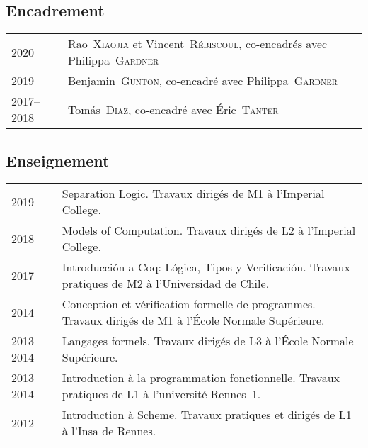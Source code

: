 \documentclass[12pt,a4paper]{article}
\makeatletter
\newcommand{\en}[1]{\foreignlanguage{english}{{#1}}}
\newcommand{\es}[1]{\foreignlanguage{spanish}{{#1}}}
\newcommand{\en}[1]{\foreignlanguage{english}{{#1}}}
\newcommand{\es}[1]{\foreignlanguage{spanish}{{#1}}}
\newenvironment{datecvsection}[1]%
               {\subsection*{#1}%
                 \noindent \begin{tabular}{@{}p{\annee}p{\texte}@{}}}
               {\end{tabular}}
\newcommand\familyName{\textsc}
\newcommand\placeName{}
\makeatother
\begin{document}
\begin{datecvsection}{Encadrement}

    2020 & Rao~\familyName{Xiaojia} et Vincent~\familyName{Rébiscoul}, co-encadrés avec Philippa~\familyName{Gardner} \\
    2019 & Benjamin~\familyName{Gunton}, co-encadré avec Philippa~\familyName{Gardner} \\
    2017–2018 & Tomás~\familyName{Diaz}, co-encadré avec Éric~\familyName{Tanter} \\

\end{datecvsection}

\begin{datecvsection}{Enseignement}

    2019 & Separation Logic. Travaux dirigés de M1 à l’\en{\placeName{Imperial College}}. \\

    2018 & Models of Computation. Travaux dirigés de L2 à l’\en{\placeName{Imperial College}}. \\

    2017 & Introducción a Coq: Lógica, Tipos y Verificación. Travaux pratiques de M2 à l’\es{\placeName{Universidad de Chile}}. \\

    2014 & Conception et vérification formelle de programmes. Travaux dirigés de M1 à l’\placeName{École Normale Supérieure}. \\

    2013–2014 & Langages formels. Travaux dirigés de L3 à l’\placeName{École Normale Supérieure}. \\

    2013–2014 & Introduction à la programmation fonctionnelle. Travaux pratiques de L1 à l’université \placeName{Rennes}~1. \\

    2012 & Introduction à Scheme. Travaux pratiques et dirigés de L1 à l’\placeName{Insa} de \placeName{Rennes}. \\

\end{datecvsection}
\end{document}
